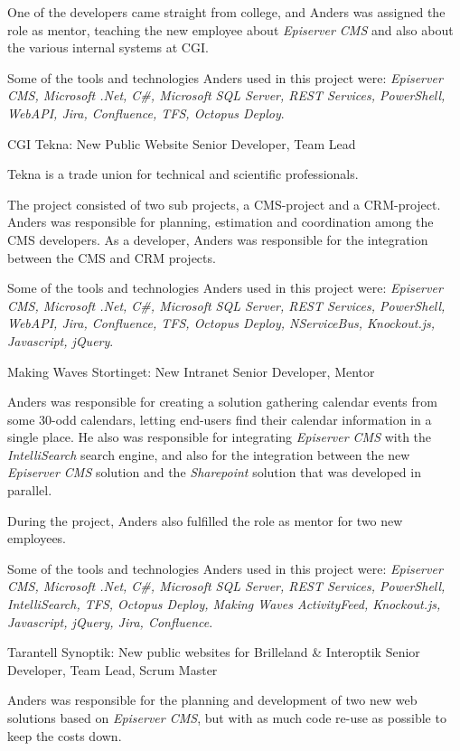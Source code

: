 \documentclass[10pt]{article} %
\begin{document}
\begin{paracol}{2}
{\qquad One of the developers came straight from college, and Anders was assigned the role as mentor, teaching the new employee about \textit{Episerver CMS} and also about the various internal systems at CGI. 

\qquad Some of the tools and technologies Anders used in this project were: \textit{Episerver CMS, Microsoft .Net, C\#, Microsoft SQL Server, REST Services, PowerShell, WebAPI, Jira, Confluence, TFS, Octopus Deploy}.} 

{CGI} 
{Tekna: New Public Website} 
{Senior Developer, Team Lead} 
{Tekna is a trade union for technical and scientific professionals.

\qquad The project consisted of two sub projects, a CMS-project and a CRM-project. Anders was responsible for planning, estimation and coordination among the CMS developers. As a developer, Anders was responsible for the integration between the CMS and CRM projects.

\qquad Some of the tools and technologies Anders used in this project were: \textit{Episerver CMS, Microsoft .Net, C\#, Microsoft SQL Server, REST Services, PowerShell, WebAPI, Jira, Confluence, TFS, Octopus Deploy, NServiceBus, Knockout.js, Javascript, jQuery}.} 

{Making Waves} 
{Stortinget: New Intranet} 
{Senior Developer, Mentor} 
{Anders was responsible for creating a solution gathering calendar events from some 30-odd calendars, letting end-users find their calendar information in a single place. He also was responsible for integrating \textit{Episerver CMS} with the \textit{IntelliSearch} search engine, and also for the integration between the new \textit{Episerver CMS} solution and the \textit{Sharepoint} solution that was developed in parallel.

\qquad During the project, Anders also fulfilled the role as mentor for two new employees.

\qquad Some of the tools and technologies Anders used in this project were: \textit{Episerver CMS, Microsoft .Net, C\#, Microsoft SQL Server, REST Services, PowerShell, IntelliSearch, TFS, Octopus Deploy, Making Waves ActivityFeed, Knockout.js, Javascript, jQuery, Jira, Confluence}.} 



{Tarantell} 
{Synoptik: New public websites for Brilleland \& Interoptik} 
{Senior Developer, Team Lead, Scrum Master} 
{Anders was responsible for the planning and development of two new web solutions based on \textit{Episerver CMS}, but with as much code re-use as possible to keep the costs down.

}
\end{paracol}
\end{document}
